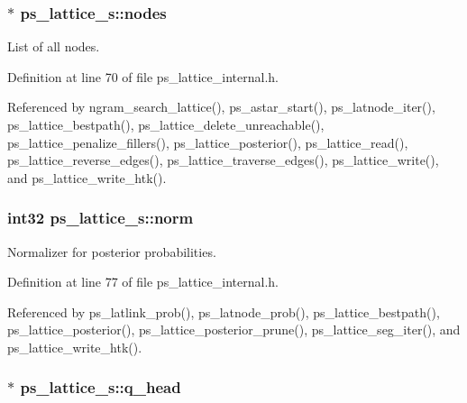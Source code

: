 \subsubsection[{nodes}]{$\ast$ ps\-\_\-lattice\-\_\-s\-::nodes}\label{structps__lattice__s_a838bd9223e35d012419e6225b54e393d}


List of all nodes. 



Definition at line 70 of file ps\-\_\-lattice\-\_\-internal.\-h.



Referenced by ngram\-\_\-search\-\_\-lattice(), ps\-\_\-astar\-\_\-start(), ps\-\_\-latnode\-\_\-iter(), ps\-\_\-lattice\-\_\-bestpath(), ps\-\_\-lattice\-\_\-delete\-\_\-unreachable(), ps\-\_\-lattice\-\_\-penalize\-\_\-fillers(), ps\-\_\-lattice\-\_\-posterior(), ps\-\_\-lattice\-\_\-read(), ps\-\_\-lattice\-\_\-reverse\-\_\-edges(), ps\-\_\-lattice\-\_\-traverse\-\_\-edges(), ps\-\_\-lattice\-\_\-write(), and ps\-\_\-lattice\-\_\-write\-\_\-htk().

\subsubsection[{norm}]{\setlength{\rightskip}{0pt plus 5cm}int32 ps\-\_\-lattice\-\_\-s\-::norm}\label{structps__lattice__s_a68c3259613a16628e1dd2e8147705d8e}


Normalizer for posterior probabilities. 



Definition at line 77 of file ps\-\_\-lattice\-\_\-internal.\-h.



Referenced by ps\-\_\-latlink\-\_\-prob(), ps\-\_\-latnode\-\_\-prob(), ps\-\_\-lattice\-\_\-bestpath(), ps\-\_\-lattice\-\_\-posterior(), ps\-\_\-lattice\-\_\-posterior\-\_\-prune(), ps\-\_\-lattice\-\_\-seg\-\_\-iter(), and ps\-\_\-lattice\-\_\-write\-\_\-htk().

\subsubsection[{q\-\_\-head}]{$\ast$ ps\-\_\-lattice\-\_\-s\-::q\-\_\-head}\label{structps__lattice__s_a26c029189074db2f668d5a9d67eb7af5}


